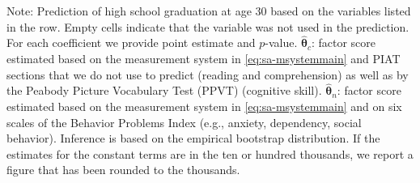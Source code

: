 \documentclass[static]{JJH-Beamer}
\begin{document}
\begin{frame}
\begin{table}[H]
\begin{center}
{\begin{tabular}{lcccccccc}
\end{tabular}
}
\end{center}
\tiny \flushleft
Note: Prediction of high school graduation at age 30 based on the variables listed in the row. Empty cells indicate that the variable was not used in the prediction. For each coefficient we provide point estimate and $p$-value. $\hat{\bm{\theta}}_{c}$: factor score estimated based on the measurement system in \eqref{eq:sa-msystemmain} and PIAT sections that we do not use to predict (reading and comprehension) as well as by the Peabody Picture Vocabulary Test (PPVT) (cognitive skill). $\hat{\bm{\theta}}_{n}$: factor score estimated based on the measurement system in \eqref{eq:sa-msystemmain} and on six scales of the Behavior Problems Index (e.g., anxiety, dependency, social behavior). Inference is based on the empirical bootstrap distribution. If the estimates for the constant terms are in the ten or hundred thousands, we report a figure that has been rounded to the thousands.\\
\end{table}

\end{frame}
\end{document}
